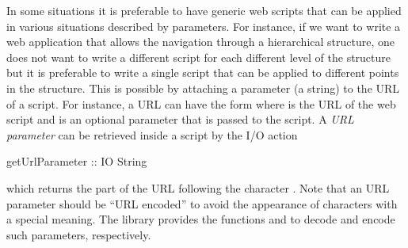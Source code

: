 In some situations it is preferable to have generic web scripts that
can be applied in various situations described by parameters.
For instance, if we want to write a web application that
allows the navigation through a hierarchical structure,
one does not want to write a different script for each different
level of the structure but it is preferable to write a single
script that can be applied to different points in the structure.
This is possible by attaching a parameter (a string)
to the URL of a script. For instance, a URL can have the form
 where
 is the URL of the web script
and  is an optional parameter that is passed
to the script.
A \emph{URL parameter}
can be retrieved inside a script
by the I/O action
\begin{prog}
getUrlParameter :: IO String 
\end{prog}
which returns the part of the URL following the character .
Note that an URL parameter should be ``URL encoded'' to avoid
the appearance of characters with a special meaning.
The  library provides the functions
 and 
to decode and encode such parameters, respectively.


